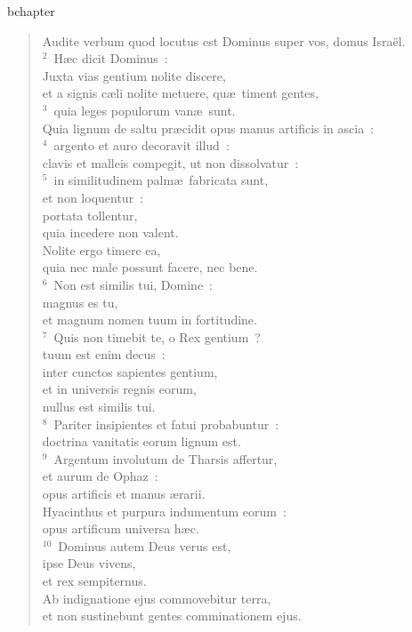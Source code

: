 bchapter\begin{verse}\vspace{-19pt}Audite verbum quod locutus est Dominus super vos, domus Isra\"el.\\
${}^{2}$~H\ae c dicit Dominus~:\\ Juxta vias gentium nolite discere,\\ et a signis c\ae li nolite metuere, qu\ae\ timent gentes,\\
${}^{3}$~quia leges populorum van\ae\ sunt.\\ Quia lignum de saltu pr\ae cidit opus manus artificis in ascia~:\\
${}^{4}$~argento et auro decoravit illud~:\\ clavis et malleis compegit, ut non dissolvatur~:\\
${}^{5}$~in similitudinem palm\ae\ fabricata sunt,\\ et non loquentur~:\\ portata tollentur,\\ quia incedere non valent.\\ Nolite ergo timere ea,\\ quia nec male possunt facere, nec bene.\\
${}^{6}$~Non est similis tui, Domine~:\\ magnus es tu,\\ et magnum nomen tuum in fortitudine.\\
${}^{7}$~Quis non timebit te, o Rex gentium~?\\ tuum est enim decus~:\\ inter cunctos sapientes gentium,\\ et in universis regnis eorum,\\ nullus est similis tui.\\
${}^{8}$~Pariter insipientes et fatui probabuntur~:\\ doctrina vanitatis eorum lignum est.\\
${}^{9}$~Argentum involutum de Tharsis affertur,\\ et aurum de Ophaz~:\\ opus artificis et manus \ae rarii.\\ Hyacinthus et purpura indumentum eorum~:\\ opus artificum universa h\ae c.\\
${}^{10}$~Dominus autem Deus verus est,\\ ipse Deus vivens,\\ et rex sempiternus.\\ Ab indignatione ejus commovebitur terra,\\ et non sustinebunt gentes comminationem ejus.\\

\end{verse}
